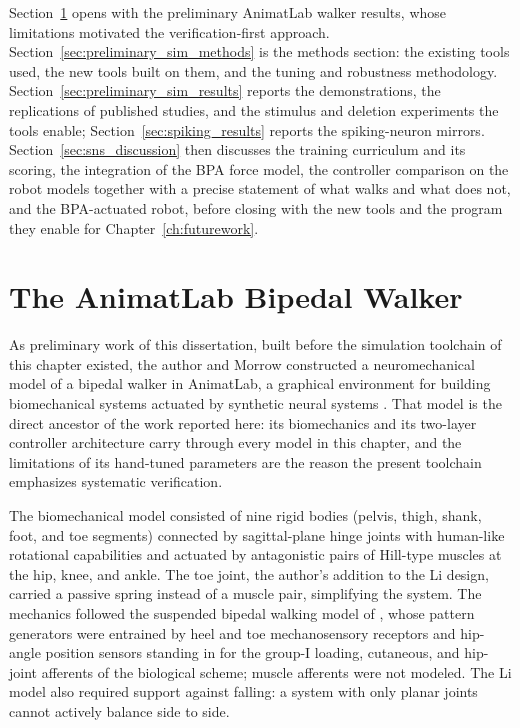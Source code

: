 Section~\ref{sec:prior_walker} opens with the preliminary AnimatLab walker results, whose limitations motivated the verification-first approach. Section~\ref{sec:preliminary_sim_methods} is the methods section: the existing tools used, the new tools built on them, and the tuning and robustness methodology. Section~\ref{sec:preliminary_sim_results} reports the demonstrations, the replications of published studies, and the stimulus and deletion experiments the tools enable; Section~\ref{sec:spiking_results} reports the spiking-neuron mirrors. Section~\ref{sec:sns_discussion} then discusses the training curriculum and its scoring, the integration of the BPA force model, the controller comparison on the robot models together with a precise statement of what walks and what does not, and the BPA-actuated robot, before closing with the new tools and the program they enable for Chapter~\ref{ch:futurework}.

\section{The AnimatLab Bipedal Walker}\label{sec:prior_walker}

As preliminary work of this dissertation, built before the simulation toolchain of this chapter existed, the author and Morrow constructed a neuromechanical model of a bipedal walker in AnimatLab, a graphical environment for building biomechanical systems actuated by synthetic neural systems \citep{cofer_animatlab_2010}. That model is the direct ancestor of the work reported here: its biomechanics and its two-layer controller architecture carry through every model in this chapter, and the limitations of its hand-tuned parameters are the reason the present toolchain emphasizes systematic verification.

The biomechanical model consisted of nine rigid bodies (pelvis, thigh, shank, foot, and toe segments) connected by sagittal-plane hinge joints with human-like rotational capabilities and actuated by antagonistic pairs of Hill-type muscles at the hip, knee, and ankle. The toe joint, the author's addition to the Li design, carried a passive spring instead of a muscle pair, simplifying the system. The mechanics followed the suspended bipedal walking model of \citet{li_bipedal_2017}, whose pattern generators were entrained by heel and toe mechanosensory receptors and hip-angle position sensors standing in for the group-I loading, cutaneous, and hip-joint afferents of the biological scheme; muscle afferents were not modeled. The Li model also required support against falling: a system with only planar joints cannot actively balance side to side.

